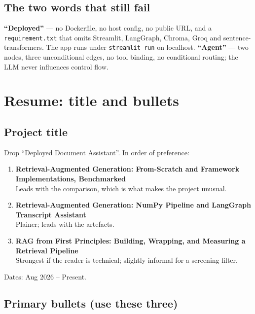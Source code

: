 \documentclass[11pt,a4paper]{article}
\begin{document}
\subsection{The two words that still fail}

\textbf{``Deployed''} --- no Dockerfile, no host config, no public URL, and a
\texttt{requirement.txt} that omits Streamlit, LangGraph, Chroma, Groq and
sentence-transformers. The app runs under \texttt{streamlit run} on localhost.
\textbf{``Agent''} --- two nodes, three unconditional edges, no tool binding, no
conditional routing; the LLM never influences control flow.

\section{Resume: title and bullets}

\subsection{Project title}

Drop ``Deployed Document Assistant''. In order of preference:

\begin{enumerate}
  \item \textbf{Retrieval-Augmented Generation: From-Scratch and Framework
        Implementations, Benchmarked} \\
        Leads with the comparison, which is what makes the project unusual.
  \item \textbf{Retrieval-Augmented Generation: NumPy Pipeline and LangGraph
        Transcript Assistant} \\
        Plainer; leads with the artefacts.
  \item \textbf{RAG from First Principles: Building, Wrapping, and Measuring a
        Retrieval Pipeline} \\
        Strongest if the reader is technical; slightly informal for a screening
        filter.
\end{enumerate}

\noindent
Dates: Aug 2026 -- Present.

\subsection{Primary bullets (use these three)}
\end{document}
